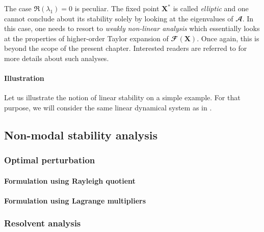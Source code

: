   The case $\Re \left( \lambda_1 \right) = 0$ is peculiar. The fixed point $\mathbf{X}^*$ is called \emph{elliptic} and one cannot conclude about its stability solely by looking at the eigenvalues of $\mathbfcal{A}$. In this case, one needs to resort to \emph{weakly non-linear analysis} which essentially looks at the properties of higher-order Taylor expansion of $\mathbfcal{F} \left( \mathbf{X} \right)$. Once again, this is beyond the scope of the present chapter. Interested readers are referred to \cite{??} for more details about such analyses.

  \paragraph*{Illustration}

  Let us illustrate the notion of linear stability on a simple example. For that purpose, we will consider the same linear dynamical system as in \cite{amr:schmid:2014}.



  \subsection{Non-modal stability analysis}
  \label{subsec: theory -- non-modal stability}

    \subsubsection{Optimal perturbation}
    \label{subsubsec: theory -- optimal perturbation}

      \paragraph{Formulation using Rayleigh quotient}

      \paragraph{Formulation using Lagrange multipliers}

    \subsubsection{Resolvent analysis}
    \label{subsubsec: theory -- resolvent}

